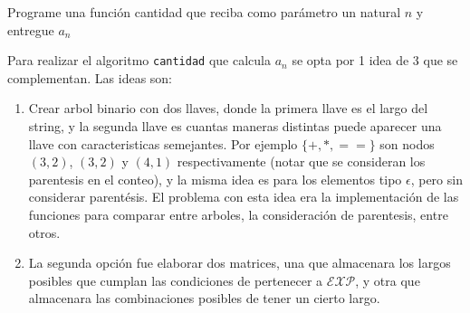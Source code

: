 \documentclass[letterpaper,10pt,table, dvipsnames]{article}
\begin{document}
\begin{tcolorbox}
 Programe una función cantidad que reciba como parámetro un natural $n$ y entregue $a_n$ 
\end{tcolorbox}

Para realizar el algoritmo \texttt{cantidad} que calcula $a_n$ se opta por 1 idea de 3 que se complementan. Las ideas son:

\begin{enumerate}
  \item Crear arbol binario con dos llaves, donde la primera llave es el largo del string, y la segunda llave es cuantas maneras distintas puede aparecer una llave con caracteristicas semejantes. Por ejemplo $\{+, *, ==\}$ son nodos $(3,2)$, $(3,2)$ y $(4,1)$ respectivamente (notar que se consideran los parentesis en el conteo), y la misma idea es para los elementos tipo $\epsilon$, pero sin considerar parentésis. El problema con esta idea era la implementación de las funciones para comparar entre arboles, la consideración de parentesis, entre otros.
  \item La segunda opción fue elaborar dos matrices, una que almacenara los largos posibles que cumplan las condiciones de pertenecer a $\mathcal{EXP}$, y otra que almacenara las combinaciones posibles de tener un cierto largo.
\begin{table}[htbp]
  \centering
\begin{minipage}[h]{0.4\linewidth}
\end{minipage}
\end{table}
\end{enumerate}
\end{document}
